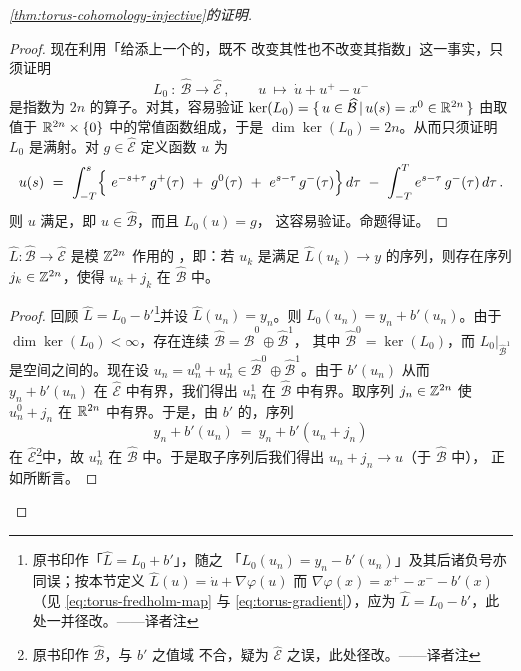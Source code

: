 \begin{proof}[\cref*{thm:torus-cohomology-injective}的证明]
\begin{proof}
现在利用「给\trLinearOperator{}添上一个\trCompact{}的\trLinearOperator{}，既不%
改变其\trFredholm{}性也不改变其\trFredholm{}指数」这一事实，只须证明%
\trLinearOperator
\begin{equation}\label{eq:torus-l0-operator}
L_{0}\ :\ \widehat{\mathcal{B}}\to\widehat{\mathcal{E}}\,,\qquad u\ \mapsto\ %
\dot{u}+u^{+}-u^{-}
\end{equation}
是指数为 $2n$ 的\trFredholm{}算子。对其\trKernel，容易验证%
$\ker(L_{0})=\{\,u\in\widehat{\mathcal{B}}\,|\,u(s)=x^{0}\in\mathbb{R}^{2n}\,\}$ 由取值于%
$\mathbb{R}^{2n}\times\{0\}$ 中的常值函数组成，于是 $\dim\ker(L_{0})=2n$。从而只须证明%
$L_{0}$ 是满射。对 $g\in\widehat{\mathcal{E}}$ 定义函数 $u$ 为
\[
u(s)\ =\ \int_{-T}^{s}\Bigl\{\ e^{-s+\tau}\,g^{+}(\tau)\ +\ g^{0}(\tau)\ +\ %
e^{s-\tau}\,g^{-}(\tau)\Bigr\}\,d\tau\ -\ \int_{-T}^{T}e^{s-\tau}\,g^{-}(\tau)\,d\tau\,.
\]
则 $u$ 满足\trBoundaryCondition，即 $u\in\widehat{\mathcal{B}}$，而且 $L_{0}(u)=g$，%
这容易验证。命题得证。
\end{proof}

\begin{proposition}\label{prop:proper-mod-action}
$\widehat{L}:\widehat{\mathcal{B}}\to\widehat{\mathcal{E}}$ 是模 $\mathbb{Z}^{2n}$ 作用的%
\trProperMap，即：若 $u_{k}$ 是满足 $\widehat{L}(u_{k})\to y$ 的序列，则存在序列%
$j_{k}\in\mathbb{Z}^{2n}$，使得 $u_{k}+j_{k}$ 在 $\widehat{\mathcal{B}}$ 中\trPrecompact。
\end{proposition}

\begin{proof}
回顾 $\widehat{L}=L_{0}-b'$\footnote{原书印作「$\widehat{L}=L_{0}+b'$」，随之%
「$L_{0}(u_{n})=y_{n}-b'(u_{n})$」及其后诸负号亦同误；按本节定义%
$\widehat{L}(u)=\dot{u}+\nabla\varphi(u)$ 而 $\nabla\varphi(x)=x^{+}-x^{-}-b'(x)$%
（见 \eqref{eq:torus-fredholm-map} 与 \eqref{eq:torus-gradient}），应为%
$\widehat{L}=L_{0}-b'$，此处一并径改。——译者注}并设 $\widehat{L}(u_{n})=y_{n}$。则%
$L_{0}(u_{n})=y_{n}+b'(u_{n})$。由于 $\dim\ker(L_{0})<\infty$，存在连续\trSplitting%
$\widehat{\mathcal{B}}=\widehat{\mathcal{B}}^{0}\oplus\widehat{\mathcal{B}}^{1}$，%
其中 $\widehat{\mathcal{B}}^{0}=\ker(L_{0})$，而 $L_{0}\big|_{\widehat{\mathcal{B}}^{1}}$%
是\trBanach{}空间之间的\trIsomorphism。现在设 $u_{n}=u_{n}^{0}+u_{n}^{1}\in%
\widehat{\mathcal{B}}^{0}\oplus\widehat{\mathcal{B}}^{1}$。由于 $b'(u_{n})$ 从而%
$y_{n}+b'(u_{n})$ 在 $\widehat{\mathcal{E}}$ 中有界，我们得出 $u_{n}^{1}$ 在%
$\widehat{\mathcal{B}}$ 中有界。取序列 $j_{n}\in\mathbb{Z}^{2n}$ 使 $u_{n}^{0}+j_{n}$ 在%
$\mathbb{R}^{2n}$ 中有界。于是，由 $b'$ 的\trCompactness，序列
\[
y_{n}+b'(u_{n})\ =\ y_{n}+b'(u_{n}+j_{n})
\]
在 $\widehat{\mathcal{E}}$\footnote{原书印作 $\widehat{\mathcal{B}}$，与 $b'$ 之值域%
不合，疑为 $\widehat{\mathcal{E}}$ 之误，此处径改。——译者注}中\trPrecompact，故%
$u_{n}^{1}$ 在 $\widehat{\mathcal{B}}$ 中\trPrecompact。于是取子序列后我们得出%
$u_{n}+j_{n}\to u$（于 $\widehat{\mathcal{B}}$ 中），%
正如所断言。
\end{proof}


\end{proof}
